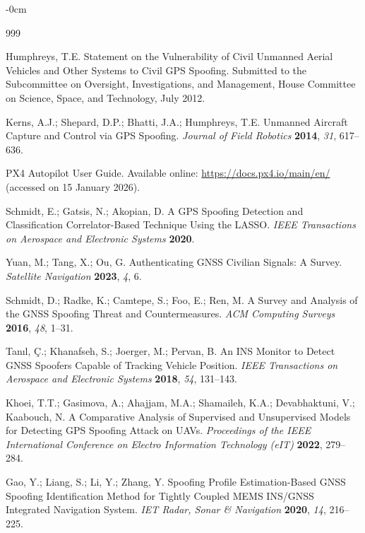 \documentclass[electronics,article,accept,moreauthors]{Definitions/mdpi}
\begin{document}
\begin{adjustwidth}{-\extralength}{0cm}


\begin{thebibliography}{999}

Humphreys, T.E. Statement on the Vulnerability of Civil Unmanned Aerial Vehicles and Other Systems to Civil GPS Spoofing. Submitted to the Subcommittee on Oversight, Investigations, and Management, House Committee on Science, Space, and Technology, July 2012.

Kerns, A.J.; Shepard, D.P.; Bhatti, J.A.; Humphreys, T.E. Unmanned Aircraft Capture and Control via GPS Spoofing. \textit{Journal of Field Robotics} \textbf{2014}, \textit{31}, 617--636.

PX4 Autopilot User Guide. Available online: \url{https://docs.px4.io/main/en/} (accessed on 15 January 2026).

Schmidt, E.; Gatsis, N.; Akopian, D. A GPS Spoofing Detection and Classification Correlator-Based Technique Using the LASSO. \textit{IEEE Transactions on Aerospace and Electronic Systems} \textbf{2020}.

Yuan, M.; Tang, X.; Ou, G. Authenticating GNSS Civilian Signals: A Survey. \textit{Satellite Navigation} \textbf{2023}, \textit{4}, 6.

Schmidt, D.; Radke, K.; Camtepe, S.; Foo, E.; Ren, M. A Survey and Analysis of the GNSS Spoofing Threat and Countermeasures. \textit{ACM Computing Surveys} \textbf{2016}, \textit{48}, 1--31.

Tanıl, \c{C}.; Khanafseh, S.; Joerger, M.; Pervan, B. An INS Monitor to Detect GNSS Spoofers Capable of Tracking Vehicle Position. \textit{IEEE Transactions on Aerospace and Electronic Systems} \textbf{2018}, \textit{54}, 131--143.

Khoei, T.T.; Gasimova, A.; Ahajjam, M.A.; Shamaileh, K.A.; Devabhaktuni, V.; Kaabouch, N. A Comparative Analysis of Supervised and Unsupervised Models for Detecting GPS Spoofing Attack on UAVs. \textit{Proceedings of the IEEE International Conference on Electro Information Technology (eIT)} \textbf{2022}, 279--284.

Gao, Y.; Liang, S.; Li, Y.; Zhang, Y. Spoofing Profile Estimation-Based GNSS Spoofing Identification Method for Tightly Coupled MEMS INS/GNSS Integrated Navigation System. \textit{IET Radar, Sonar \& Navigation} \textbf{2020}, \textit{14}, 216--225.


\end{thebibliography}
\end{adjustwidth}
\end{document}
